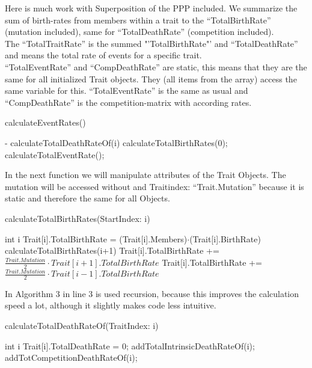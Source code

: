 \documentclass{article}
\begin{document}
Here is much work with Superposition of the PPP included. We summarize the sum of birth-rates from members within a trait to the "`TotalBirthRate"' (mutation included), same for "`TotalDeathRate"' (competition included). \\
The "`TotalTraitRate"' is the summed  "'TotalBirthRate"' and "`TotalDeathRate"' and means the total rate of events for a specific trait. \\
"`TotalEventRate"' and "`CompDeathRate"' are static, this means that they are the same for all initialized Trait objects. They (all items from the array) access the same variable for this. "`TotalEventRate"' is the same as usual and "`CompDeathRate"' is the competition-matrix with according rates.\\	
\begin{algorithm}[H]
	\caption{calculateEventRates()}
	\begin{algorithmic}[1]
		\REQUIRE -
			\STATE calculateTotalDeathRateOf(i)
		\ENDFOR
		\STATE calculateTotalBirthRates(0);
		\STATE calculateTotalEventRate();
	\end{algorithmic}
\end{algorithm}
In the next function we will manipulate attributes of the Trait Objects. The mutation will be accessed without and Traitindex: "`Trait.Mutation"' because it is static and therefore the same for all Objects.
\begin{algorithm}[H]
	\caption{calculateTotalBirthRates(StartIndex: i)}
	\begin{algorithmic}[1]
		\REQUIRE int i
		\STATE Trait[i].TotalBirthRate = (Trait[i].Members)$\cdot$(Trait[i].BirthRate)
			\STATE calculateTotalBirthRates(i+1)
			\STATE Trait[i].TotalBirthRate += $\frac{Trait.Mutation}{2}\cdot Trait[i+1].TotalBirthRate $
		\ENDIF
			\STATE Trait[i].TotalBirthRate += $\frac{Trait.Mutation}{2}\cdot Trait[i-1].TotalBirthRate $
		\ENDIF
	\end{algorithmic}
\end{algorithm}
In Algorithm 3 in line 3 is used recursion, because this improves the calculation speed a lot, although it slightly makes code less intuitive.

\begin{algorithm}[H][H]
	\caption{calculateTotalDeathRateOf(TraitIndex: i)}
	\begin{algorithmic}[1]
		\REQUIRE int i
		\STATE Trait[i].TotalDeathRate = 0;
		\STATE addTotalIntrinsicDeathRateOf(i);
		\STATE addTotCompetitionDeathRateOf(i);
	\end{algorithmic}
\end{algorithm}
\end{document}
